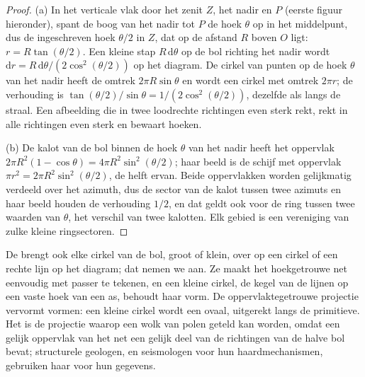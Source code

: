 \begin{proof}
(a) In het verticale vlak door het zenit $Z$, het nadir en $P$
(eerste figuur hieronder), spant de boog van het nadir tot $P$
de hoek $\theta$ op in het middelpunt, dus de ingeschreven hoek
$\theta/2$ in $Z$, dat op de afstand $R$ boven $O$ ligt: $r =
R\tan(\theta/2)$. Een kleine stap $R\,\mathrm d\theta$ op de bol richting het
nadir wordt $\mathrm dr = R\,\mathrm d\theta/(2\cos^2(\theta/2))$ op het
diagram. De cirkel van punten op de hoek $\theta$ van het nadir heeft de
omtrek $2\pi R\sin\theta$ en wordt een cirkel met omtrek $2\pi
r$; de verhouding is $\tan(\theta/2)/\sin\theta = 1/(2\cos^2(\theta/2))$, dezelfde
als langs de straal. Een afbeelding die in twee loodrechte
richtingen even sterk rekt, rekt in alle richtingen even sterk en bewaart hoeken.

(b) De kalot van de bol binnen de hoek $\theta$ van het nadir heeft het oppervlak
$2\pi R^2(1 - \cos\theta) = 4\pi R^2\sin^2(\theta/2)$; haar beeld is de schijf
met oppervlak $\pi r^2 = 2\pi R^2\sin^2(\theta/2)$, de helft ervan. Beide oppervlakken worden
gelijkmatig verdeeld over het azimuth, dus de sector van de kalot tussen twee azimuts
en haar beeld houden de verhouding $1/2$, en dat geldt ook voor de ring tussen twee waarden
van $\theta$, het verschil van twee kalotten. Elk gebied is een vereniging van zulke
kleine ringsectoren.
\end{proof}

De  brengt ook elke cirkel van de bol, groot of
klein, over op een cirkel of een rechte lijn op het diagram; dat nemen we aan. Ze maakt het
hoekgetrouwe net eenvoudig met passer te tekenen, en een kleine cirkel, de kegel van
de lijnen op een vaste hoek van een as, behoudt haar vorm. De oppervlaktegetrouwe
projectie vervormt vormen: een kleine cirkel wordt een ovaal, uitgerekt
langs de primitieve. Het is de projectie waarop een wolk van polen geteld kan worden,
omdat een gelijk oppervlak van het net een gelijk deel van de
richtingen van de halve bol bevat; structurele geologen, en seismologen voor hun
haardmechanismen, gebruiken haar voor hun gegevens.

